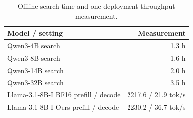 \begin{table}[t]\centering\small
\caption{Offline search time and one deployment throughput measurement.}
\label{tab:efficiency-v20}
\begin{tabular}{lr}\toprule Model / setting & Measurement\\\midrule
Qwen3-4B search & 1.3 h\\ Qwen3-8B search & 1.6 h\\ Qwen3-14B search & 2.0 h\\ Qwen3-32B search & 3.5 h\\\midrule
Llama-3.1-8B-I BF16 prefill / decode & 2217.6 / 21.9 tok/s\\
Llama-3.1-8B-I Ours prefill / decode & 2230.2 / 36.7 tok/s\\\bottomrule
\end{tabular}\end{table}
